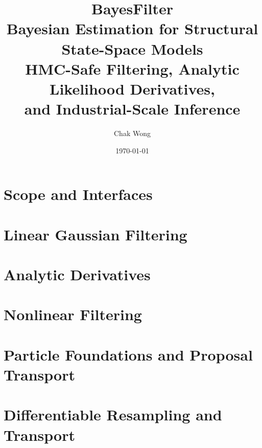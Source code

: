 \documentclass[12pt,a4paper,openany]{book}
\title{\Huge\textbf{BayesFilter}\\[12pt]
  \Large Bayesian Estimation for Structural State-Space Models\\[4pt]
  \large HMC-Safe Filtering, Analytic Likelihood Derivatives,\\
  and Industrial-Scale Inference}
\author{Chak Wong}
\date{\today}
\begin{document}
\frontmatter
\maketitle
\tableofcontents

\mainmatter

\part{Scope and Interfaces}





\part{Linear Gaussian Filtering}





\part{Analytic Derivatives}







\part{Nonlinear Filtering}






\part{Particle Foundations and Proposal Transport}




\part{Differentiable Resampling and Transport}





\end{document}
